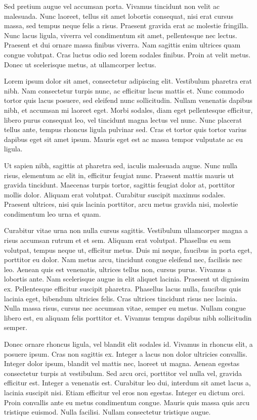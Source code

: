 \documentclass[a4paper]{memoir}
\begin{document}
Sed pretium augue vel accumsan porta. Vivamus tincidunt non velit ac malesuada. Nunc laoreet, tellus sit amet lobortis consequat, nisi erat cursus massa, sed tempus neque felis a risus. Praesent gravida erat ac molestie fringilla. Nunc lacus ligula, viverra vel condimentum sit amet, pellentesque nec lectus. Praesent et dui ornare massa finibus viverra. Nam sagittis enim ultrices quam congue volutpat. Cras luctus odio sed lorem sodales finibus. Proin at velit metus. Donec ut scelerisque metus, at ullamcorper lectus. 

Lorem ipsum dolor sit amet, consectetur adipiscing elit. Vestibulum pharetra erat nibh. Nam consectetur turpis nunc, ac efficitur lacus mattis et. Nunc commodo tortor quis lacus posuere, sed eleifend nunc sollicitudin. Nullam venenatis dapibus nibh, et accumsan mi laoreet eget. Morbi sodales, diam eget pellentesque efficitur, libero purus consequat leo, vel tincidunt magna lectus vel nunc. Nunc placerat tellus ante, tempus rhoncus ligula pulvinar sed. Cras et tortor quis tortor varius dapibus eget sit amet ipsum. Mauris eget est ac massa tempor vulputate ac eu ligula. 

Ut sapien nibh, sagittis at pharetra sed, iaculis malesuada augue. Nunc nulla risus, elementum ac elit in, efficitur feugiat nunc. Praesent mattis mauris ut gravida tincidunt. Maecenas turpis tortor, sagittis feugiat dolor at, porttitor mollis dolor. Aliquam erat volutpat. Curabitur suscipit maximus sodales. Praesent ultrices, nisi quis lacinia porttitor, arcu metus gravida nisi, molestie condimentum leo urna et quam. 

Curabitur vitae urna non nulla cursus sagittis. Vestibulum ullamcorper magna a risus accumsan rutrum et et sem. Aliquam erat volutpat. Phasellus eu sem volutpat, tempus neque ut, efficitur metus. Duis mi neque, faucibus in porta eget, porttitor eu dolor. Nam metus arcu, tincidunt congue eleifend nec, facilisis nec leo. Aenean quis est venenatis, ultrices tellus non, cursus purus. Vivamus a lobortis ante. Nam scelerisque augue in elit aliquet lacinia. Praesent ut dignissim ex. Pellentesque efficitur suscipit pharetra. Phasellus lacus nulla, faucibus quis lacinia eget, bibendum ultricies felis. Cras ultrices tincidunt risus nec lacinia. Nulla massa risus, cursus nec accumsan vitae, semper eu metus. Nullam congue libero est, eu aliquam felis porttitor et. Vivamus tempus dapibus nibh sollicitudin semper. 

Donec ornare rhoncus ligula, vel blandit elit sodales id. Vivamus in rhoncus elit, a posuere ipsum. Cras non sagittis ex. Integer a lacus non dolor ultricies convallis. Integer dolor ipsum, blandit vel mattis nec, laoreet ut magna. Aenean egestas consectetur turpis at vestibulum. Sed arcu orci, porttitor vel nulla vel, gravida efficitur est. Integer a venenatis est. Curabitur leo dui, interdum sit amet lacus a, lacinia suscipit nisi. Etiam efficitur vel eros non egestas. Integer eu dictum orci. Proin convallis ante eu metus condimentum congue. Mauris quis massa quis arcu tristique euismod. Nulla facilisi. Nullam consectetur tristique augue. 
\end{document}

